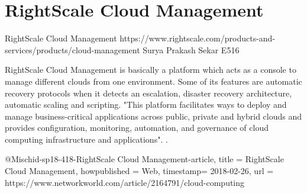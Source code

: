 \section{RightScale Cloud Management}


RightScale Cloud Management
https://www.rightscale.com/products-and-services/products/cloud-management
Surya Prakash Sekar
E516

RightScale Cloud Management is basically a platform which acts as a console to
manage different clouds from one environment. Some of its features are
automatic recovery protocols when it detects an escalation, disaster recovery 
architecture, automatic scaling and scripting. "This platform facilitates ways 
to deploy and manage business-critical applications across public, 
private and hybrid clouds and provides configuration, monitoring, automation, 
and governance of cloud computing infrastructure and applications". 
\cite{hid-sp18-418-RightScale Cloud Management-article}.

@Misc{hid-sp18-418-RightScale Cloud Management-article,
title = {RightScale Cloud Management},
howpublished = {Web},
timestamp= {2018-02-26},
url = {https://www.networkworld.com/article/2164791/cloud-computing}
}
